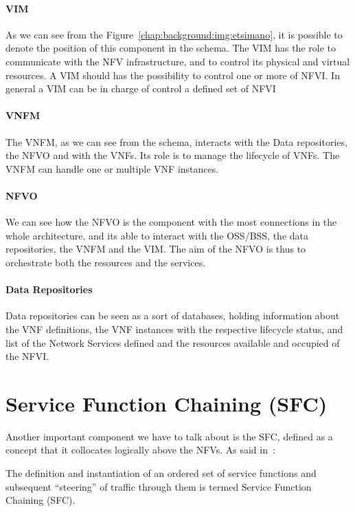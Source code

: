 \paragraph{VIM}
As we can see from the Figure~\ref{chap:background:img:etsimano}, it is possible
to denote the position of this component in the schema. The VIM has the role to
communicate with the NFV infrastructure, and to control its physical and virtual
resources. A VIM should has the possibility to control one or more of NFVI. In
general a VIM can be in charge of control a defined set of
NFVI~\cite{mijumbi2016management}

\paragraph{VNFM}
The VNFM, as we can see from the schema, interacts with the Data repositories,
the NFVO and with the VNFs. Its role is to manage the lifecycle of VNFs. The
VNFM can handle one or multiple VNF instances.

\paragraph{NFVO}
We can see how the NFVO is the component with the most connections in the whole
architecture, and its able to interact with the OSS/BSS, the data repositories,
the VNFM and the VIM. The aim of the NFVO is thus to orchestrate both the
resources and the services.

\paragraph{Data Repositories}
Data repositories can be seen as a sort of databases, holding information about
the VNF definitions, the VNF instances with the respective lifecycle status, and
list of the Network Services defined and the resources available and occupied of
the NFVI.

\section{Service Function Chaining (SFC)}
\label{chap:background:sec:sfc}
Another important component we have to talk about is the SFC, defined as a
concept that it collocates logically above the NFVs. As said in~\cite{rfc7665}:
\begin{displayquote}
The definition and instantiation of an ordered set of service functions and
subsequent ``steering'' of traffic through them is termed Service Function
Chaining (SFC).
\end{displayquote}

